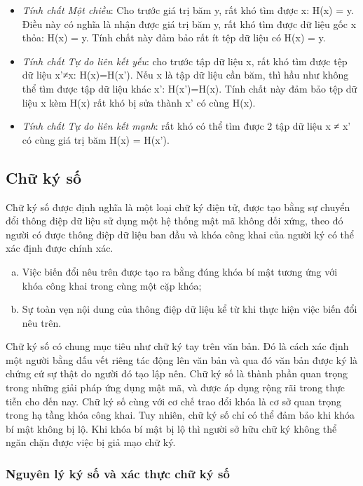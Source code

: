 \begin{itemize}
\item \emph{Tính chất Một chiều}: Cho trước giá trị băm y, rất khó tìm được x: H(x) = y. Điều này có nghĩa là nhận được giá trị băm y, rất khó tìm được dữ liệu gốc x thỏa: H(x) = y. Tính chất này đảm bảo rất ít tệp dữ liệu có H(x) = y.

\item \emph{Tính chất Tự do liên kết yếu}: cho trước tập dữ liệu x, rất khó tìm được tệp dữ liệu x’≠x: H(x)=H(x’). Nếu x là tập dữ liệu cần băm, thì hầu như không thể tìm được tập dữ liệu khác x’: H(x’)=H(x). Tính chất này đảm bảo tệp dữ liệu x kèm H(x) rất khó bị sửa thành x’ có cùng H(x).

\item \emph{Tính chất Tự do liên kết mạnh}: rất khó có thể tìm được 2 tập dữ liệu x ≠ x’ có cùng giá trị băm H(x) = H(x’).
\end{itemize}

\subsection{Chữ ký số}
Chữ ký số được định nghĩa là một loại chữ ký điện tử, được tạo bằng sự chuyển đổi thông điệp dữ liệu sử dụng một hệ thống mật mã không đối xứng, theo đó người có được thông điệp dữ liệu ban đầu và khóa công khai của người ký có thể xác định được chính xác.

\begin{enumerate}[a)]
\item Việc biến đổi nêu trên được tạo ra bằng đúng khóa bí mật tương ứng với khóa công khai trong cùng một cặp khóa;
\item Sự toàn vẹn nội dung của thông điệp dữ liệu kể từ khi thực hiện việc biến đổi nêu trên.
\end{enumerate}

Chữ ký số có chung mục tiêu như chữ ký tay trên văn bản. Đó là cách xác định một người bằng dấu vết riêng tác động lên văn bản và qua đó văn bản được ký là chứng cứ sự thật do người đó tạo lập nên. Chữ ký số là thành phần quan trọng trong những giải pháp ứng dụng mật mã, và được áp dụng rộng rãi trong thực tiễn cho đến nay. Chữ ký số cùng với cơ chế trao đổi khóa là cơ sở quan trọng trong hạ tầng khóa công khai. Tuy nhiên, chữ ký số chỉ có thể đảm bảo khi khóa bí mật không bị lộ. Khi khóa bí mật bị lộ thì người sở hữu chữ ký không thể ngăn chặn được việc bị giả mạo chữ ký.

\subsubsection{Nguyên lý ký số và xác thực chữ ký số }

